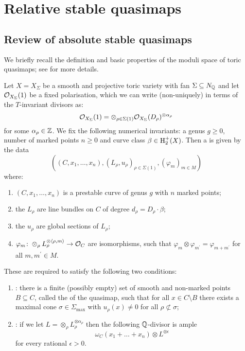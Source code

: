 \section{Relative stable quasimaps} \label{Section relative stable quasimaps}

\subsection{Review of absolute stable quasimaps} \label{Subsection stable quasimaps}
We briefly recall the definition and basic properties of the moduli space of toric quasimaps; see \cite{CF-K} for more details.
\begin{definition}[{\cite[Definition 3.1.1]{CF-K}}] Let $X= X_{\Sigma}$ be a smooth and projective toric variety with fan $\Sigma \subseteq N_{\mathbb{Q}}$ and let $\mathcal{O}_{X_\Sigma}(1)$ be a fixed polarisation, which we can write (non-uniquely) in terms of the $T$-invariant divisors as:
\begin{equation*} \mathcal{O}_{X_\Sigma}(1) = \otimes_{\rho \in \Sigma(1)} \mathcal{O}_{X_\Sigma}(D_\rho)^{\otimes \alpha_\rho} \end{equation*}
for some $\alpha_\rho \in \mathbb{Z}$. We fix the following numerical invariants: a genus $g \geq 0$, number of marked points $n \geq 0$ and curve class $\beta \in \operatorname{H}_2^+(X)$. Then a  is given by the data
\begin{equation*} ((C,x_1,\ldots,x_n), (L_\rho,u_\rho)_{\rho \in \Sigma(1)}, (\varphi_m)_{m \in M}) \end{equation*}
where:
\begin{enumerate}
\item $(C,x_1,\ldots,x_n)$ is a prestable curve of genus $g$ with $n$ marked points;
\item the $L_\rho$ are line bundles on $C$ of degree $d_\rho = D_\rho \cdot \beta$;
\item the $u_\rho$ are global sections of $L_\rho$;
\item $\varphi_m \colon \otimes_\rho L_\rho^{\otimes \langle \rho, m \rangle} \rightarrow \mathcal{O}_C$ are isomorphisms, such that $\varphi_{m} \otimes \varphi_{m^\prime} = \varphi_{m + m^\prime}$ for all $m, m^\prime \in M$.
\end{enumerate}
These are required to satisfy the following two conditions:
\begin{enumerate}
\item {}: there is a finite (possibly empty) set of smooth and non-marked points $B \subseteq C$, called the  of the quasimap, such that for all $x \in C \setminus B$ there exists a maximal cone $\sigma \in \Sigma_{\operatorname{max}}$ with $u_\rho(x) \neq 0$ for all $\rho \not\subset \sigma$;
\item {}: if we let $L = \otimes_\rho L_\rho^{\otimes \alpha_\rho}$ then the following $\mathbb{Q}$-divisor is ample
\begin{equation*} \omega_C(x_1 + \ldots + x_n)\otimes L^{\otimes \epsilon} \end{equation*}
for every rational $\epsilon > 0$.
\end{enumerate}
\end{definition}

